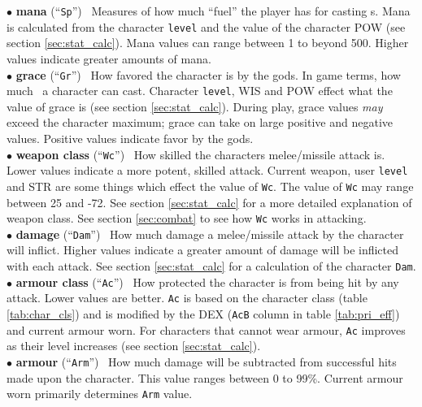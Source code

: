 $\bullet$ {\bf mana} (``{\tt Sp}'')
 \emdash\ Measures of how much ``fuel'' the player
has for casting \incantation s.  Mana is calculated from the character
{\tt level}
and the value of the character POW (see section \ref{sec:stat_calc}).
Mana values can range between 1 to beyond
500. Higher values indicate greater amounts of mana. \\

$\bullet$ {\bf grace} (``{\tt Gr}'')
 \emdash\
How favored the character is by the gods. In game terms, how much
\divinemagic\ a character can cast. Character {\tt level}, WIS and POW effect
what the value of grace is (see section
\ref{sec:stat_calc}).  During play, grace values
{\em may} exceed the character maximum; grace can take on large positive
and negative values. Positive values indicate favor by the gods.\\

$\bullet$ {\bf weapon class} (``{\tt Wc}'')
 \emdash\
How skilled the characters melee/missile attack is. Lower values indicate a
more potent, skilled attack. Current weapon, user {\tt level} and STR are some
things which effect the value of {\tt Wc}. The value of {\tt Wc} may
range between 25 and -72.
See section \ref{sec:stat_calc} for a more detailed explanation of weapon
class. See section \ref{sec:combat} to see how {\tt Wc} works in attacking.\\

$\bullet$ {\bf damage}\index{damage} (``{\tt Dam}'')\index{stats, Dam}
 \emdash\ How much
damage a melee/missile attack by the character will inflict. Higher values
indicate a greater amount of damage will be inflicted with each attack.
See section \ref{sec:stat_calc} for a calculation of the character {\tt Dam}.
\\

$\bullet$ {\bf armour class}
(``{\tt Ac}'') \emdash\ How
protected the character is from being hit by any attack. Lower values
are better. {\tt Ac} is based on the character class (table \ref{tab:char_cls})
and is modified by the DEX ({\tt AcB} column in table \ref{tab:pri_eff}) and
current armour worn. For characters that cannot wear armour, {\tt Ac} improves
as their level increases (see section \ref{sec:stat_calc}). \\

$\bullet$ {\bf armour} (``{\tt Arm}'')
\emdash\
How much damage will be subtracted from successful hits made upon
the character. This value ranges between 0 to 99\%. Current armour worn
primarily determines {\tt Arm} value. \\

